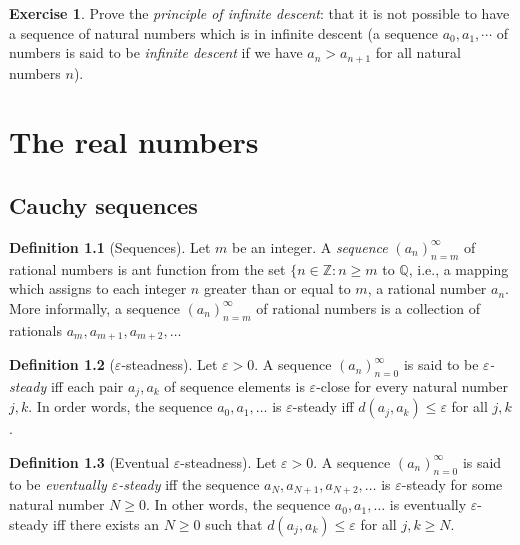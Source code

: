 \documentclass[
]{book}
\theoremstyle{definition}
\newtheorem{definition}{Definition}[chapter]
\theoremstyle{definition}
\theoremstyle{definition}
\newtheorem{exercise}{Exercise}[chapter]
\theoremstyle{definition}
\theoremstyle{remark}
\begin{document}
\begin{exercise}
\protect\hypertarget{exr:id}{}\label{exr:id}Prove the \emph{principle of infinite descent}: that it is not possible to have a sequence of natural numbers which is in infinite descent (a sequence \(a_0,a_1,\cdots\) of numbers is said to be \emph{infinite descent} if we have \(a_n>a_{n+1}\) for all natural numbers \(n\)).
\end{exercise}

\chapter{The real numbers}\label{real}

\section{Cauchy sequences}\label{cauchy-sequences}

\begin{definition}[Sequences]
Let \(m\) be an integer. A \emph{sequence} \((a_n)_{n=m}^{\infty}\) of rational numbers is ant function from the set \(\{n\in \mathbb{Z}: n \geq m\) to \(\mathbb{Q}\), i.e., a mapping which assigns to each integer \(n\) greater than or equal to \(m\), a rational number \(a_n\). More informally, a sequence \((a_n)_{n=m}^{\infty}\) of rational numbers is a collection of rationals \(a_m, a_{m+1}, a_{m+2}, \dots\)
\end{definition}

\begin{definition}[$\varepsilon$-steadness]
Let \(\varepsilon>0\). A sequence \((a_n)_{n=0}^{\infty}\) is said to be \emph{\(\varepsilon\)-steady} iff each pair \(a_j, a_k\) of sequence elements is \(\varepsilon\)-close for every natural number \(j,k\). In order words, the sequence \(a_0,a_1,\dots\) is \(\varepsilon\)-steady iff \(d(a_j,a_k)\leq \varepsilon\) for all \(j,k\).
\end{definition}

\begin{definition}[Eventual $\varepsilon$-steadness]
Let \(\varepsilon>0\). A sequence \((a_n)_{n=0}^{\infty}\) is said to be \emph{eventually \(\varepsilon\)-steady} iff the sequence \(a_N, a_{N+1}, a_{N+2}, \dots\) is \(\varepsilon\)-steady for some natural number \(N\geq 0\). In other words, the sequence \(a_0,a_1,\dots\) is eventually \(\varepsilon\)-steady iff there exists an \(N\geq 0\) such that \(d(a_j,a_k)\leq \varepsilon\) for all \(j,k\geq N\).
\end{definition}
\end{document}
